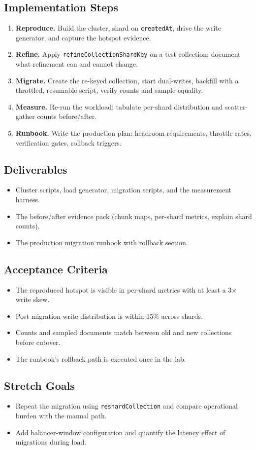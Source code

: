 \subsection*{Implementation Steps}
\begin{enumerate}
    \item \textbf{Reproduce.} Build the cluster, shard on \texttt{createdAt}, drive the write generator, and capture the hotspot evidence.
    \item \textbf{Refine.} Apply \texttt{refineCollectionShardKey} on a test collection; document what refinement can and cannot change.
    \item \textbf{Migrate.} Create the re-keyed collection, start dual-writes, backfill with a throttled, resumable script, verify counts and sample equality.
    \item \textbf{Measure.} Re-run the workload; tabulate per-shard distribution and scatter-gather counts before/after.
    \item \textbf{Runbook.} Write the production plan: headroom requirements, throttle rates, verification gates, rollback triggers.
\end{enumerate}

\subsection*{Deliverables}
\begin{itemize}
    \item Cluster scripts, load generator, migration scripts, and the measurement harness.
    \item The before/after evidence pack (chunk maps, per-shard metrics, explain shard counts).
    \item The production migration runbook with rollback section.
\end{itemize}

\subsection*{Acceptance Criteria}
\begin{itemize}
    \item The reproduced hotspot is visible in per-shard metrics with at least a 3$\times$ write skew.
    \item Post-migration write distribution is within 15\% across shards.
    \item Counts and sampled documents match between old and new collections before cutover.
    \item The runbook's rollback path is executed once in the lab.
\end{itemize}

\subsection*{Stretch Goals}
\begin{itemize}
    \item Repeat the migration using \texttt{reshardCollection} and compare operational burden with the manual path.
    \item Add balancer-window configuration and quantify the latency effect of migrations during load.
\end{itemize}
